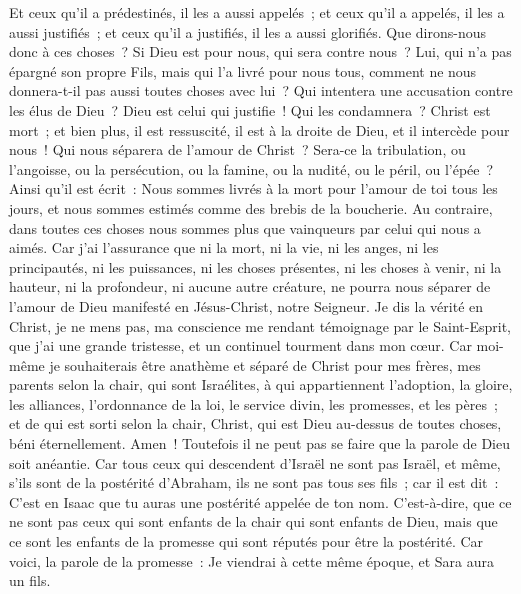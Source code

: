 \begin{multicols}{2}
Et ceux qu'il a prédestinés, il les a aussi appelés~; et ceux qu'il a appelés, il les a aussi justifiés~; et ceux qu'il a justifiés, il les a aussi glorifiés.
Que dirons-nous donc à ces choses~? Si Dieu est pour nous, qui sera contre nous~?
Lui, qui n'a pas épargné son propre Fils, mais qui l'a livré pour nous tous, comment ne nous donnera-t-il pas aussi toutes choses avec lui~?
Qui intentera une accusation contre les élus de Dieu~? Dieu est celui qui justifie~!
Qui les condamnera~? Christ est mort~; et bien plus, il est ressuscité, il est à la droite de Dieu, et il intercède pour nous~!
Qui nous séparera de l'amour de Christ~? Sera-ce la tribulation, ou l'angoisse, ou la persécution, ou la famine, ou la nudité, ou le péril, ou l'épée~?
Ainsi qu'il est écrit~: Nous sommes livrés à la mort pour l'amour de toi tous les jours, et nous sommes estimés comme des brebis de la boucherie.
Au contraire, dans toutes ces choses nous sommes plus que vainqueurs par celui qui nous a aimés.
Car j'ai l'assurance que ni la mort, ni la vie, ni les anges, ni les principautés, ni les puissances, ni les choses présentes, ni les choses à venir,
ni la hauteur, ni la profondeur, ni aucune autre créature, ne pourra nous séparer de l'amour de Dieu manifesté en Jésus-Christ, notre Seigneur.
\VerseOne{}Je dis la vérité en Christ, je ne mens pas, ma conscience me rendant témoignage par le Saint-Esprit,
que j'ai une grande tristesse, et un continuel tourment dans mon cœur.
Car moi-même je souhaiterais être anathème et séparé de Christ pour mes frères, mes parents selon la chair,
qui sont Israélites, à qui appartiennent l'adoption, la gloire, les alliances, l'ordonnance de la loi, le service divin,
les promesses, et les pères~; et de qui est sorti selon la chair, Christ, qui est Dieu au-dessus de toutes choses, béni éternellement. Amen~!
Toutefois il ne peut pas se faire que la parole de Dieu soit anéantie. Car tous ceux qui descendent d'Israël ne sont pas Israël,
et même, s'ils sont de la postérité d'Abraham, ils ne sont pas tous ses fils~; car il est dit~: C'est en Isaac que tu auras une postérité appelée de ton nom.
C'est-à-dire, que ce ne sont pas ceux qui sont enfants de la chair qui sont enfants de Dieu, mais que ce sont les enfants de la promesse qui sont réputés pour être la postérité.
Car voici, la parole de la promesse~: Je viendrai à cette même époque, et Sara aura un fils.

\end{multicols}
